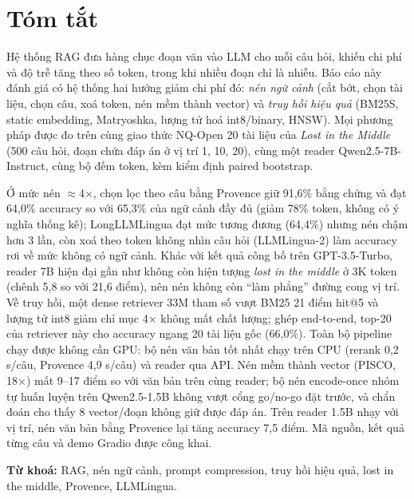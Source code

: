 \section*{Tóm tắt}

Hệ thống RAG đưa hàng chục đoạn văn vào LLM cho mỗi câu hỏi, khiến chi phí và độ trễ tăng theo số
token, trong khi nhiều đoạn chỉ là nhiễu. Báo cáo này đánh giá có hệ thống hai hướng giảm chi phí đó:
\emph{nén ngữ cảnh} (cắt bớt, chọn tài liệu, chọn câu, xoá token, nén mềm thành vector) và \emph{truy
hồi hiệu quả} (BM25S, static embedding, Matryoshka, lượng tử hoá int8/binary, HNSW). Mọi phương pháp được
đo trên cùng giao thức NQ-Open 20 tài liệu của \emph{Lost in the Middle} (500 câu hỏi, đoạn chứa đáp
án ở vị trí 1, 10, 20), cùng một reader Qwen2.5-7B-Instruct, cùng bộ đếm token, kèm kiểm định paired bootstrap.

Ở mức nén $\approx$4$\times$, chọn lọc theo câu bằng Provence giữ 91,6\% bằng chứng và đạt 64,0\%
accuracy so với 65,3\% của ngữ cảnh đầy đủ (giảm 78\% token, không có ý nghĩa thống kê);
LongLLMLingua đạt mức tương đương (64,4\%) nhưng nén chậm hơn 3 lần, còn xoá theo token không nhìn câu
hỏi (LLMLingua-2) làm accuracy rơi về mức không có ngữ cảnh. Khác với kết quả công bố trên
GPT-3.5-Turbo, reader 7B hiện đại gần như không còn hiện tượng \emph{lost in the middle} ở 3K token (chênh
5,8 so với 21,6 điểm), nên nén không còn ``làm phẳng'' đường cong vị trí. Về truy hồi, một dense retriever 33M tham số vượt BM25 21 điểm hit@5 và lượng tử int8 giảm chỉ mục 4$\times$ không mất chất
lượng; ghép end-to-end, top-20 của retriever này cho accuracy ngang 20 tài liệu gốc (66,0\%). Toàn bộ
pipeline chạy được không cần GPU: bộ nén văn bản tốt nhất chạy trên CPU (rerank 0,2 s/câu, Provence 4,9 s/câu) và reader qua API.
Nén mềm thành vector (PISCO, 18$\times$) mất 9--17 điểm so với văn bản trên cùng reader; bộ nén
encode-once nhóm tự huấn luyện trên Qwen2.5-1.5B không vượt cổng go/no-go đặt trước, và chẩn đoán cho
thấy 8 vector/đoạn không giữ được đáp án. Trên reader 1.5B nhạy với vị trí, nén văn bản bằng Provence
lại tăng accuracy 7,5 điểm.
Mã nguồn, kết quả từng câu và demo Gradio được công khai.

\vspace{0.6em}
\noindent\textbf{Từ khoá:} RAG, nén ngữ cảnh, prompt compression, truy hồi hiệu quả, lost in the
middle, Provence, LLMLingua.
